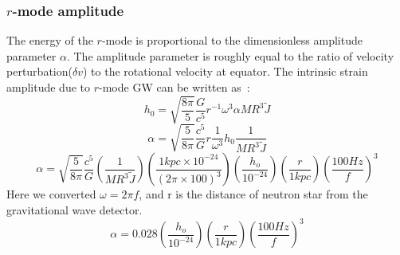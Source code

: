 \documentclass{ttuthes2007}
\begin{document}
\subsubsection{$r$-mode amplitude}
The energy of the $r$-mode is proportional to the dimensionless amplitude
parameter $\alpha$. The amplitude parameter is roughly equal to the ratio of
velocity perturbation($\delta v$) to the rotational velocity at equator. The
intrinsic strain amplitude due to $r$-mode \ac{GW} can be written
as~\cite{Owen:2010ng}:
\begin{equation*}                                                               
h_0 =\sqrt{\frac{8\pi}{5}}\frac{G}{c^5}r^{-1}\omega^3 \alpha M R^3 \tilde{J}      
\end{equation*}                                                                 
\begin{equation*}                                                               
\alpha = \sqrt{\frac{5}{8\pi}}\frac{c^5}{G} r \frac{1}{\omega^3} h_0 \frac{1}{M   
R^3 \tilde{J}}                                                                  
\end{equation*}                                                                 
\begin{equation*}                                                               
\alpha=\sqrt{\frac{5}{8\pi}}\frac{c^5}{G}\left(\frac{1}{M                       
R^3 \tilde{J}}\right)\left(\frac{1kpc\times 10^{-24}}{(2\pi \times
100)^3}\right)
\left(\frac{h_o}{10^{-24}}\right)\left(\frac{r}{1kpc}\right)\left(\frac{100Hz}{f}\right)^3
\end{equation*}                                                                 
Here we converted $\omega=2\pi f$, and r is the distance of neutron star from
the gravitational wave detector.                          
\begin{equation} 
\alpha =0.028\left(\frac{h_o}{10^{-24}}\right)\left(\frac{r}{1kpc}\right)\left(\frac{100Hz}{f}\right)^3
\end{equation}           
\end{document}
